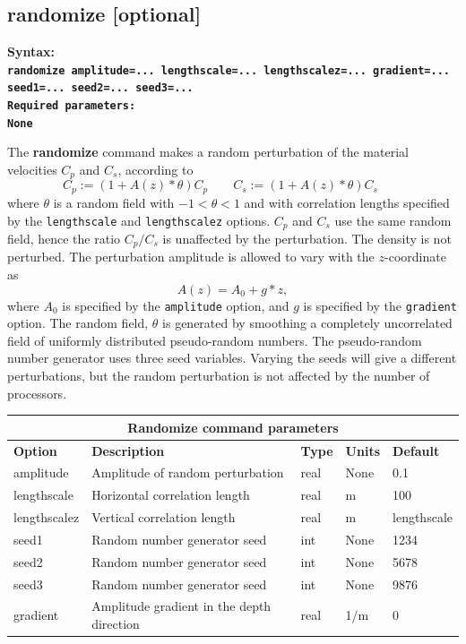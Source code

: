 \documentclass[11pt]{report}
\begin{document}
\subsection{randomize [optional]}
\label{keyword:randomize}
\begin{flushleft}\bf
Syntax:\\
\tt randomize amplitude=... lengthscale=... lengthscalez=... gradient=... seed1=... seed2=... seed3=... \\
\bf Required parameters:\\
\rm None
\end{flushleft}
The {\bf randomize} command makes a random perturbation of the material velocities $C_p$ and $C_s$, according to
$$
 C_p := (1+A(z)*\theta)C_p\qquad C_s := (1+A(z)*\theta)C_s\qquad
$$
where $\theta$ is a random field with $-1 <\theta<1$ and with correlation lengths specified by the {\tt lengthscale}
and {\tt lengthscalez} options. $C_p$ and $C_s$ use the same random field, hence the ratio $C_p/C_s$ is unaffected
by the perturbation. The density is not perturbed.
The perturbation amplitude is allowed to vary with the $z$-coordinate as
$$
 A(z) = A_0 + g*z,
$$
where $A_0$ is specified by the {\tt amplitude} option, and $g$ is specified by the {\tt gradient} option.
The random field, $\theta$ is generated by smoothing a completely uncorrelated field of uniformly 
distributed pseudo-random numbers. 
The pseudo-random number generator uses three seed variables. Varying the seeds will give a different perturbations, but
the random perturbation is not affected by the number of processors.
\begin{center}
\begin{tabular}{|l|p{8cm}|l|l||l|} \hline
\multicolumn{5}{|c|}{\bf Randomize command parameters}\\ \hline
\bf{Option}  & \bf{Description} & \bf{Type} & \bf{Units} & \bf{Default} \\ \hline \hline
amplitude    & Amplitude of random perturbation & real & None & 0.1 \\ \hline
lengthscale  & Horizontal correlation length & real & m & 100 \\ \hline
lengthscalez & Vertical correlation length & real & m & lengthscale \\ \hline
seed1 & Random number generator seed & int & None & 1234 \\ \hline
seed2 & Random number generator seed & int & None & 5678 \\ \hline
seed3 & Random number generator seed & int & None & 9876 \\ \hline
gradient & Amplitude gradient in the depth direction & real & 1/m & 0 \\ \hline
\end{tabular}
\end{center}
\end{document}
